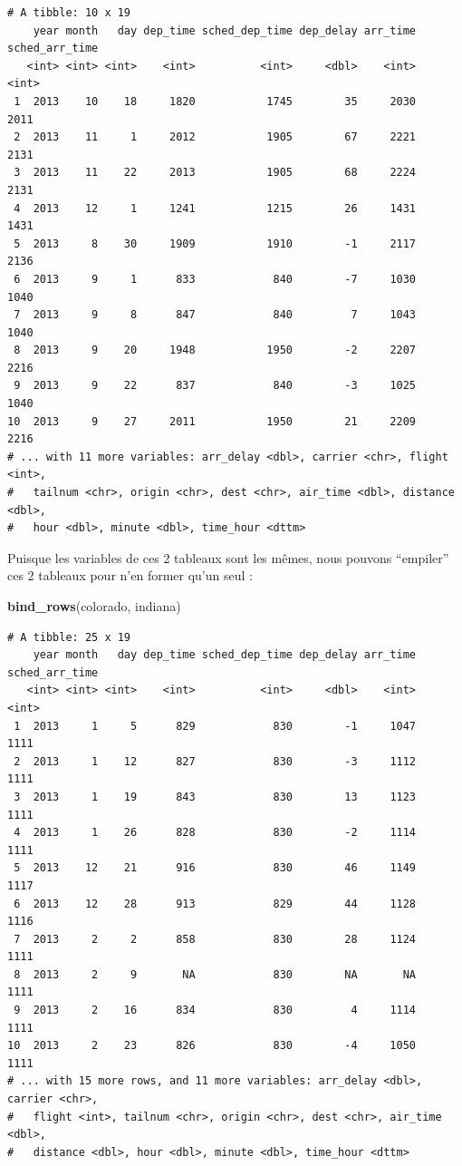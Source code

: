 \documentclass[a4paperpaper,]{article}
\newenvironment{Shaded}{\begin{snugshade}}{\end{snugshade}}
\newcommand{\KeywordTok}[1]{\textcolor[rgb]{0.12,0.11,0.11}{\textbf{#1}}}
\newcommand{\NormalTok}[1]{\textcolor[rgb]{0.12,0.11,0.11}{#1}}
\theoremstyle{definition}
\theoremstyle{definition}
\theoremstyle{definition}
\theoremstyle{remark}
\begin{document}
\begin{verbatim}
# A tibble: 10 x 19
    year month   day dep_time sched_dep_time dep_delay arr_time sched_arr_time
   <int> <int> <int>    <int>          <int>     <dbl>    <int>          <int>
 1  2013    10    18     1820           1745        35     2030           2011
 2  2013    11     1     2012           1905        67     2221           2131
 3  2013    11    22     2013           1905        68     2224           2131
 4  2013    12     1     1241           1215        26     1431           1431
 5  2013     8    30     1909           1910        -1     2117           2136
 6  2013     9     1      833            840        -7     1030           1040
 7  2013     9     8      847            840         7     1043           1040
 8  2013     9    20     1948           1950        -2     2207           2216
 9  2013     9    22      837            840        -3     1025           1040
10  2013     9    27     2011           1950        21     2209           2216
# ... with 11 more variables: arr_delay <dbl>, carrier <chr>, flight <int>,
#   tailnum <chr>, origin <chr>, dest <chr>, air_time <dbl>, distance <dbl>,
#   hour <dbl>, minute <dbl>, time_hour <dttm>
\end{verbatim}

Puisque les variables de ces 2 tableaux sont les mêmes, nous pouvons
``empiler'' ces 2 tableaux pour n'en former qu'un seul :

\begin{Shaded}
\begin{Highlighting}[]
\KeywordTok{bind_rows}\NormalTok{(colorado, indiana)}
\end{Highlighting}
\end{Shaded}

\begin{verbatim}
# A tibble: 25 x 19
    year month   day dep_time sched_dep_time dep_delay arr_time sched_arr_time
   <int> <int> <int>    <int>          <int>     <dbl>    <int>          <int>
 1  2013     1     5      829            830        -1     1047           1111
 2  2013     1    12      827            830        -3     1112           1111
 3  2013     1    19      843            830        13     1123           1111
 4  2013     1    26      828            830        -2     1114           1111
 5  2013    12    21      916            830        46     1149           1117
 6  2013    12    28      913            829        44     1128           1116
 7  2013     2     2      858            830        28     1124           1111
 8  2013     2     9       NA            830        NA       NA           1111
 9  2013     2    16      834            830         4     1114           1111
10  2013     2    23      826            830        -4     1050           1111
# ... with 15 more rows, and 11 more variables: arr_delay <dbl>, carrier <chr>,
#   flight <int>, tailnum <chr>, origin <chr>, dest <chr>, air_time <dbl>,
#   distance <dbl>, hour <dbl>, minute <dbl>, time_hour <dttm>
\end{verbatim}
\end{document}
